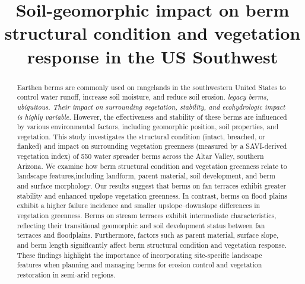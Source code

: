 \documentclass[review]{elsarticle}
\begin{document}
\begin{frontmatter}

\title{Soil-geomorphic impact on berm structural condition and vegetation response in the US Southwest}






\linenumbers

\begin{abstract} 
Earthen berms are commonly used on rangelands in the southwestern United States to control water runoff, increase soil moisture, and reduce soil erosion. 
\textit{legacy berms, ubiquitous. Their impact on surrounding vegetation, stability, and ecohydrologic impact is highly variable.}
However, the effectiveness and stability of these berms are influenced by various environmental factors, including geomorphic position, soil properties, and vegetation. This study investigates the structural condition (intact, breached, or flanked) and impact on surrounding vegetation greenness (measured by a SAVI-derived vegetation index) of 550 water spreader berms across the Altar Valley, southern Arizona.
We examine how berm structural condition and vegetation greenness relate to landscape features,including landform, parent material, soil development, and berm and surface morphology. 
Our results suggest that berms on fan terraces  exhibit greater stability and enhanced upslope vegetation greenness.
In contrast, berms on flood plains exhibit a higher failure incidence  and smaller upslope–downslope differences in vegetation greenness.
Berms on stream terraces exhibit intermediate characteristics, reflecting their transitional geomorphic and soil development status between fan terraces and floodplains. Furthermore, factors such as parent material, surface slope, and berm length significantly affect berm structural condition and vegetation response. These findings highlight the importance of incorporating site-specific landscape features when planning and managing berms for erosion control and vegetation restoration in semi-arid regions.


\end{abstract}
\end{frontmatter}
\end{document}
